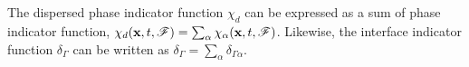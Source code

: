 The dispersed phase indicator function $\chi_d$ can be expressed as a sum of phase indicator function, $\chi_d(\textbf{x},t,\mathscr{F}) = \sum_\alpha\chi_\alpha(\textbf{x},t,\mathscr{F})$. 
Likewise, the interface indicator function $\delta_\Gamma$ can be written as $\delta_\Gamma =  \sum_\alpha  \delta_{\Gamma\alpha}$.
